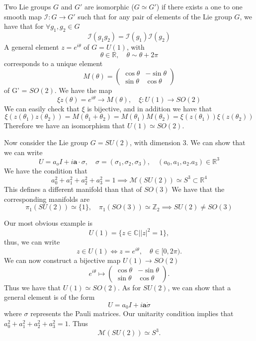 \documentclass[11pt, oneside]{article}   	%
\theoremstyle{slanted}
\begin{document}
Two Lie groups $G$ and $G' $ are isomorphic  ($G \simeq G'$) if there exists a one to one smooth map $\mathcal{ I } : G \rightarrow G' $ such that for any pair of elements of the Lie group $G$, we have that for $\forall g_1, g_2 \in G$
\[ 
	\mathcal{ I } ( g_1 g_2 ) = \mathcal{ I } ( g_1 ) \mathcal { I } ( g_2 ) 
\]
A general element $z  = e^ { i \theta } $ of $G  = U ( 1) $, with 
\[ 
	\theta \in \mathbb{ R}, \quad \theta \sim \theta + 2 \pi \] 
corresponds to a unique element 
\[ 
	M (\theta )  = \begin{pmatrix} \cos \theta &  - \sin \theta \\ \sin \theta & \cos \theta \end{pmatrix} 
\] of G'  = $SO ( 2) $. We have the map 
\[ 
	 \xi z( \theta)  = e^ { i \theta } \rightarrow M ( \theta ), \quad \xi : U ( 1) \rightarrow SO ( 2) 
	 \] 
	We can easily check that $ \xi $ is bijective, and in addition we have that 
	\[ 
	 	\xi ( z( \theta_1 ) z( \theta_ 2) )  = M ( \theta_1 + \theta_2 )  = M ( \theta_1 ) M ( \theta_2 )  = \xi ( z ( \theta_1 ) ) \xi ( z ( \theta_2 ) ) 
	\] Therefore we have an isomorphism that $U ( 1) \simeq SO ( 2) $. 

Now consider the Lie group $G = SU ( 2) $, with dimension $3$. We can show that we can write 
\[ 
	U = a_o I + i \mathbf{ a} \cdot \sigma, \quad \sigma  = ( \sigma_1, \sigma_2, \sigma_3 ), \quad (a_0 , a_1, a_2. a_3 ) \in \mathbb{R}^3 
\] We have the condition that 
\[ 
 	a_0^2 + a_1^2 + a_2^2 + a_3^2  = 1 \implies \mathcal { M }( SU ( 2) ) \simeq S^3 \subset \mathbb{ R}^4 
\] This defines a different manifold than that of $ SO ( 3) $
We have that the corresponding manifolds are 
\[ 
	 \pi_1 ( SU ( 2) ) \simeq \{ 1 \}, \quad \pi_1 ( SO ( 3) ) \simeq \mathbb{ Z}_2 \implies SU ( 2) \neq SO ( 3) 
\] 

Our most obvious example is 
\[
	U(1) = \{z \in \mathbb{C} | |z|^2 = 1 \}, 
\]
thus, we can write 
\[
	z \in U(1) \iff z = e^{i \theta}, \quad \theta \in [0, 2 \pi ). 
\]
We can now construct a bijective map $U(1) \rightarrow SO(2)$
\[ 
	e^{i \theta} \mapsto  \begin{pmatrix}
	\cos \theta &   - \sin \theta \\
	\sin \theta & \cos \theta
	\end{pmatrix}. 
\] 
Thus we have that $U(1) \simeq SO(2)$. As for $SU(2)$, we can show that a general element is of the form 
\[ 
	U = a_0I + i \mathbf{a} \dot \sigma
\]
where $\sigma$ represents the Pauli matrices. Our unitarity condition implies that $a_0^2 + a_1^2 + a_2^2 + a_3^2 = 1$. 
Thus 
\[ 
	\mathcal{M}(SU(2)) \simeq S^3. 
\] 
\end{document}
